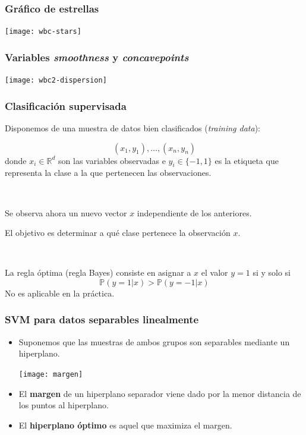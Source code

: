 \documentclass[dvipsnames, pdflatex,slidecentered]{beamer}
\begin{document}
\begin{frame}[plain]
\frametitle{Gráfico de estrellas}

\begin{center}
\texttt{[image: wbc-stars]}
\end{center}

\end{frame}
\begin{frame}[plain]
\frametitle{Variables \textit{smoothness} y \textit{concavepoints}}

\begin{center}
\texttt{[image: wbc2-dispersion]}
\end{center}

\end{frame}
\begin{frame}[plain]
\frametitle{Clasificación supervisada}

Disponemos de una muestra de datos bien clasificados (\textit{training data}):

\[
(x_1,y_1),\ldots, (x_n,y_n)
\]
donde $x_i\in \mathbb{R}^d$ son las variables observadas e $y_i\in\{-1,1\}$ es la etiqueta que representa la clase a la que pertenecen las observaciones.

\

Se observa ahora un nuevo vector $x$ independiente de los anteriores.

El objetivo es determinar a qué clase pertenece la observación $x$.

\

La regla óptima (regla Bayes) consiste en asignar a $x$ el valor $y=1$ si y solo si
\[
\mathbb{P}(y=1| x) > \mathbb{P}(y=-1|x)
\]
No es aplicable en la práctica.

\end{frame}
\begin{frame}[plain]
\frametitle{SVM para datos separables linealmente}

\begin{itemize}
\item Suponemos que las muestras de ambos grupos son separables mediante un hiperplano.

\begin{center}
\texttt{[image: margen]}
\end{center}

\item El \textbf{margen} de un hiperplano separador viene dado por la menor distancia de los puntos al hiperplano. 

 \item El \textbf{hiperplano óptimo} es aquel que maximiza el margen.

\end{itemize}

\end{frame}
\end{document}
